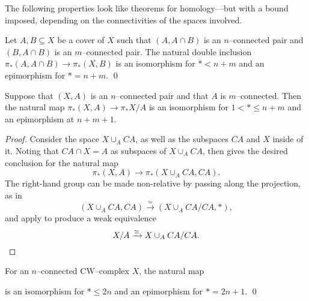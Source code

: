 \noindent The following properties look like theorems for homology---but with a bound imposed, depending on the connectivities of the spaces involved.

\begin{theorem}\label{HomotopyExcision}%
Let $A, B \subseteq X$ be a cover of $X$ such that $(A, A \cap B)$ is an $n$--connected pair and $(B, A \cap B)$ is an $m$--connected pair.
The natural double inclusion $\pi_*(A, A \cap B) \to \pi_*(X, B)$ is an isomorphism for $* < n+m$ and an epimorphism for $* = n+m$. \qed
\end{theorem}

\begin{corollary}
Suppose that $(X, A)$ is an $n$--connected pair and that $A$ is $m$--connected.
Then the natural map $\pi_*(X, A) \to \pi_* X/A$ is an isomorphism for $1 < * \le n+m$ and an epimorphism at $n+m+1$.
\end{corollary}
\begin{proof}
Consider the space $X \cup_A CA$, as well as the subspaces $CA$ and $X$ inside of it.
Noting that $CA \cap X = A$ as subspaces of $X \cup_A CA$,  then gives the desired conclusion for the natural map \[\pi_*(X, A) \to \pi_*(X \cup_A CA, CA).\]
The right-hand group can be made non-relative by passing along the projection, as in \[(X \cup_A CA, CA) \xrightarrow\simeq (X \cup_A CA/CA, *),\]
and apply  to produce a weak equivalence \[X/A \xrightarrow\simeq X \cup_A CA/CA. \qedhere\]
\end{proof}

\begin{corollary}\label{FreudenthalThm}%
For an $n$--connected CW--complex $X$, the natural map
\begin{center}
\end{center}
is an isomorphism for $* \le 2n$ and an epimorphism for $* = 2n+1$. \qed
\end{corollary}

